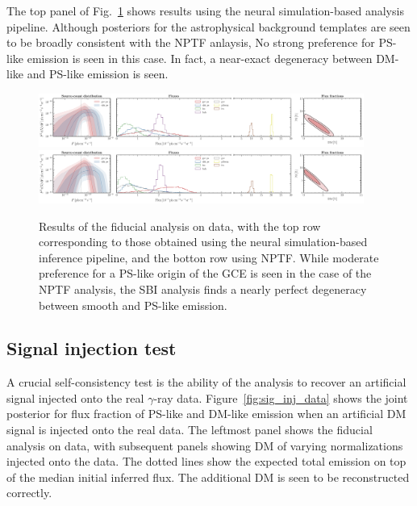 \documentclass[prd,aps,10pt,nofootinbib,twocolumn,superscriptaddress,preprintnumbers,balancelastpage,longbibliography]{revtex4-1}
\begin{document}
The top panel of Fig.~\ref{fig:fid_data} shows results using the neural simulation-based analysis pipeline. Although posteriors for the astrophysical background templates are seen to be broadly consistent with the NPTF anlaysis, No strong preference for PS-like emission is seen in this case. In fact, a near-exact degeneracy between DM-like and PS-like emission is seen.

%
\begin{figure}
    \centering
    \includegraphics[width=0.95\textwidth]{plots/data_fid_sbi.pdf}
    \includegraphics[width=0.95\textwidth]{plots/data_fid_nptf.pdf}
    \caption{Results of the fiducial analysis on data, with the top row corresponding to those obtained using the neural simulation-based inference pipeline, and the botton row using NPTF. While moderate preference for a PS-like origin of the GCE is seen in the case of the NPTF analysis, the SBI analysis finds a nearly perfect degeneracy between smooth and PS-like emission.}
    \label{fig:fid_data}
\end{figure}
%

\subsection{Signal injection test}
\label{sec:sig-injection}

A crucial self-consistency test is the ability of the analysis to recover an artificial signal injected onto the real $\gamma$-ray data. Figure~\ref{fig:sig_inj_data} shows the joint posterior for flux fraction of PS-like and DM-like emission when an artificial DM signal is injected onto the real data. The leftmost panel shows the fiducial analysis on \Fermi data, with subsequent panels showing DM of varying normalizations injected onto the data. The dotted lines show the expected total emission on top of the median initial inferred flux. The additional DM is seen to be reconstructed correctly.
\end{document}
